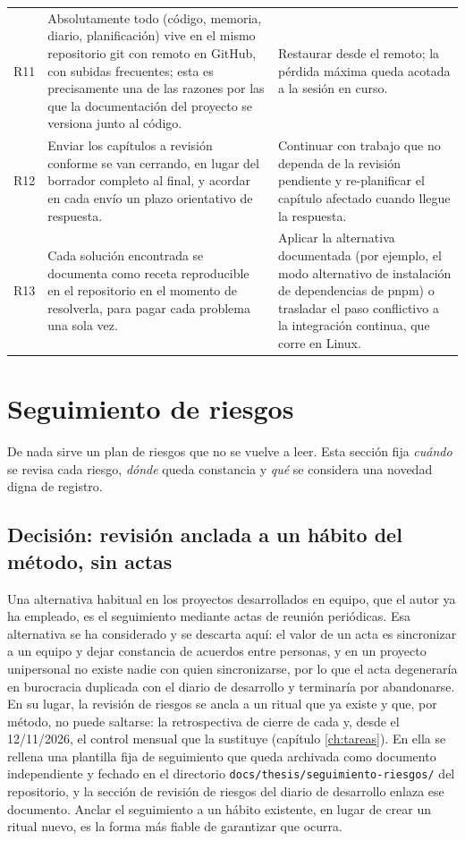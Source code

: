 \begin{longtable}{@{}>{\raggedright\arraybackslash}p{8mm}>{\raggedright\arraybackslash}p{60mm}>{\raggedright\arraybackslash}p{60mm}@{}}
  \addlinespace
  R11 & Absolutamente todo (código, memoria, diario, planificación) vive en el mismo repositorio git con remoto en GitHub, con subidas frecuentes; esta es precisamente una de las razones por las que la documentación del proyecto se versiona junto al código. & Restaurar desde el remoto; la pérdida máxima queda acotada a la sesión en curso. \\
  \addlinespace
  R12 & Enviar los capítulos a revisión conforme se van cerrando, en lugar del borrador completo al final, y acordar en cada envío un plazo orientativo de respuesta. & Continuar con trabajo que no dependa de la revisión pendiente y re-planificar el capítulo afectado cuando llegue la respuesta. \\
  \addlinespace
  R13 & Cada solución encontrada se documenta como receta reproducible en el repositorio en el momento de resolverla, para pagar cada problema una sola vez. & Aplicar la alternativa documentada (por ejemplo, el modo alternativo de instalación de dependencias de pnpm) o trasladar el paso conflictivo a la integración continua, que corre en Linux. \\
\end{longtable}
\endgroup

\section{Seguimiento de riesgos}
\label{sec:riesgos-seguimiento}

De nada sirve un plan de riesgos que no se vuelve a leer.
Esta sección fija \emph{cuándo} se revisa cada riesgo, \emph{dónde} queda constancia y \emph{qué} se considera una novedad digna de registro.

\subsection{Decisión: revisión anclada a un hábito del método, sin actas}
\label{sec:riesgos-decision-seguimiento}

Una alternativa habitual en los proyectos desarrollados en equipo, que el autor ya ha empleado, es el seguimiento mediante actas de reunión periódicas.
Esa alternativa se ha considerado y se descarta aquí: el valor de un acta es sincronizar a un equipo y dejar constancia de acuerdos entre personas, y en un proyecto unipersonal no existe nadie con quien sincronizarse, por lo que el acta degeneraría en burocracia duplicada con el diario de desarrollo y terminaría por abandonarse.
En su lugar, la revisión de riesgos se ancla a un ritual que ya existe y que, por método, no puede saltarse: la retrospectiva de cierre de cada  y, desde el 12/11/2026, el control mensual que la sustituye (capítulo \ref{ch:tareas}).
En ella se rellena una plantilla fija de seguimiento que queda archivada como documento independiente y fechado en el directorio \texttt{docs/thesis/seguimiento-riesgos/} del repositorio, y la sección de revisión de riesgos del diario de desarrollo enlaza ese documento.
Anclar el seguimiento a un hábito existente, en lugar de crear un ritual nuevo, es la forma más fiable de garantizar que ocurra.

